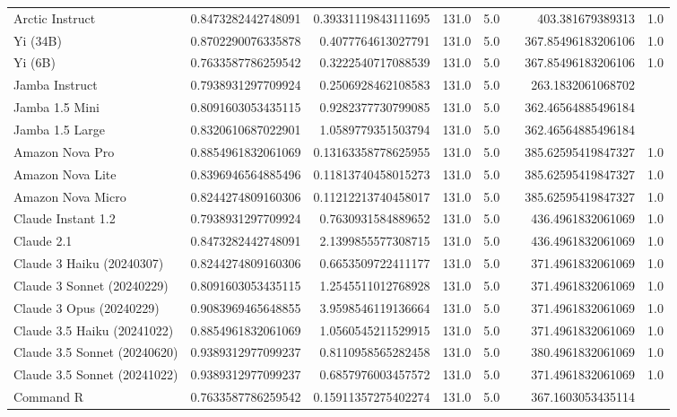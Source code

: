 \begin{table}[htp]
{\begin{tabular}{lrrrrrrr}
Arctic Instruct & 0.8473282442748091 & 0.39331119843111695 & 131.0 & 5.0 &  & 403.381679389313 & 1.0 \\
Yi (34B) & 0.8702290076335878 & 0.4077764613027791 & 131.0 & 5.0 &  & 367.85496183206106 & 1.0 \\
Yi (6B) & 0.7633587786259542 & 0.3222540717088539 & 131.0 & 5.0 &  & 367.85496183206106 & 1.0 \\
Jamba Instruct & 0.7938931297709924 & 0.2506928462108583 & 131.0 & 5.0 &  & 263.1832061068702 &  \\
Jamba 1.5 Mini & 0.8091603053435115 & 0.9282377730799085 & 131.0 & 5.0 &  & 362.46564885496184 &  \\
Jamba 1.5 Large & 0.8320610687022901 & 1.0589779351503794 & 131.0 & 5.0 &  & 362.46564885496184 &  \\
Amazon Nova Pro & 0.8854961832061069 & 0.13163358778625955 & 131.0 & 5.0 &  & 385.62595419847327 & 1.0 \\
Amazon Nova Lite & 0.8396946564885496 & 0.11813740458015273 & 131.0 & 5.0 &  & 385.62595419847327 & 1.0 \\
Amazon Nova Micro & 0.8244274809160306 & 0.11212213740458017 & 131.0 & 5.0 &  & 385.62595419847327 & 1.0 \\
Claude Instant 1.2 & 0.7938931297709924 & 0.7630931584889652 & 131.0 & 5.0 &  & 436.4961832061069 & 1.0 \\
Claude 2.1 & 0.8473282442748091 & 2.1399855577308715 & 131.0 & 5.0 &  & 436.4961832061069 & 1.0 \\
Claude 3 Haiku (20240307) & 0.8244274809160306 & 0.6653509722411177 & 131.0 & 5.0 &  & 371.4961832061069 & 1.0 \\
Claude 3 Sonnet (20240229) & 0.8091603053435115 & 1.2545511012768928 & 131.0 & 5.0 &  & 371.4961832061069 & 1.0 \\
Claude 3 Opus (20240229) & 0.9083969465648855 & 3.9598546119136664 & 131.0 & 5.0 &  & 371.4961832061069 & 1.0 \\
Claude 3.5 Haiku (20241022) & 0.8854961832061069 & 1.0560545211529915 & 131.0 & 5.0 &  & 371.4961832061069 & 1.0 \\
Claude 3.5 Sonnet (20240620) & 0.9389312977099237 & 0.8110958565282458 & 131.0 & 5.0 &  & 380.4961832061069 & 1.0 \\
Claude 3.5 Sonnet (20241022) & 0.9389312977099237 & 0.6857976003457572 & 131.0 & 5.0 &  & 371.4961832061069 & 1.0 \\
Command R & 0.7633587786259542 & 0.15911357275402274 & 131.0 & 5.0 &  & 367.1603053435114 &  \\

\end{tabular}}
\end{table}
